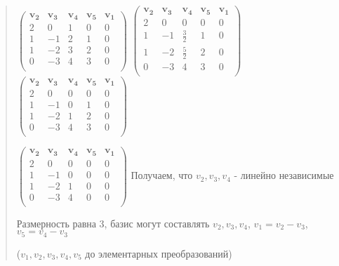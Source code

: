 \documentclass{article}
\begin{document}
\begin{quote}
\hspace{0.8cm}
$\begin{pmatrix} 
\mathbf{v_2} & \mathbf{v_3} & \mathbf{v_4} & \mathbf{v_5} & \mathbf{v_1}\\
2 & 0 & 1 & 0 & 0 \\
1 & -1 & 2 & 1 & 0 \\
1 & -2 & 3 & 2 & 0 \\
0 & -3 & 4 & 3 & 0 \\ 
\end{pmatrix}$ \Leftrightarrow
$\begin{pmatrix} 
\mathbf{v_2} & \mathbf{v_3} & \mathbf{v_4} & \mathbf{v_5} & \mathbf{v_1}\\
2 & 0 & 0 & 0 & 0 \\
1 & -1 & \frac{3}{2} & 1 & 0 \\
1 & -2 & \frac{5}{2} & 2 & 0 \\
0 & -3 & 4 & 3 & 0 \\ 
\end{pmatrix}$ \Leftrightarrow
$\begin{pmatrix} 
\mathbf{v_2} & \mathbf{v_3} & \mathbf{v_4} & \mathbf{v_5} & \mathbf{v_1}\\
2 & 0 & 0 & 0 & 0 \\
1 & -1 & 0 & 1 & 0 \\
1 & -2 & 1 & 2 & 0 \\
0 & -3 & 4 & 3 & 0 \\ 
\end{pmatrix}$ \Leftrightarrow

\hspace{0.8cm}
$\begin{pmatrix} 
\mathbf{v_2} & \mathbf{v_3} & \mathbf{v_4} & \mathbf{v_5} & \mathbf{v_1}\\
2 & 0 & 0 & 0 & 0 \\
1 & -1 & 0 & 0 & 0 \\
1 & -2 & 1 & 0 & 0 \\
0 & -3 & 4 & 0 & 0 \\ 
\end{pmatrix}$
Получаем, что $v_2, v_3, v_4$ - линейно независимые

\hspace{0.8cm}
Размерность равна 3, базис могут составлять $v_2, v_3, v_4$, \quad $v_1 = v_2 - v_3$, \quad $v_5 = v_4 - v_3$ 

\hspace{0.8cm} ($v_1, v_2, v_3, v_4, v_5$ до элементарных преобразований)
\end{quote}
\end{document}
